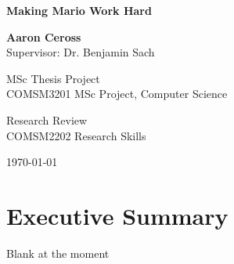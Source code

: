 \documentclass[11pt, a4paper, oneside]{report} %
\begin{document}

\begin{titlepage}
    \begin{center}
        \vspace*{4cm}

        \Huge\textbf{Making Mario Work Hard}


        \vspace{2.5cm}

       \Large\textbf{Aaron Ceross}
       \\Supervisor: Dr. Benjamin Sach

        \vspace{0.8cm}

        MSc Thesis Project\\
        COMSM3201 MSc Project, Computer Science

        Research Review\\
        COMSM2202 Research Skills

        \vspace{0.8cm}


        \today

    \end{center}
\end{titlepage}



\chapter*{Executive Summary}

Blank at the moment

\end{document}
